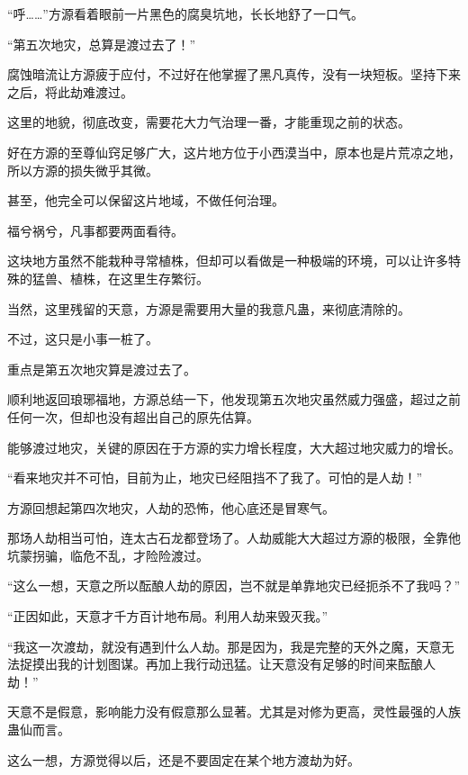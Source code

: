 
\begin{this_body}



“呼……”方源看着眼前一片黑色的腐臭坑地，长长地舒了一口气。

“第五次地灾，总算是渡过去了！”

腐蚀暗流让方源疲于应付，不过好在他掌握了黑凡真传，没有一块短板。坚持下来之后，将此劫难渡过。

这里的地貌，彻底改变，需要花大力气治理一番，才能重现之前的状态。

好在方源的至尊仙窍足够广大，这片地方位于小西漠当中，原本也是片荒凉之地，所以方源的损失微乎其微。

甚至，他完全可以保留这片地域，不做任何治理。

福兮祸兮，凡事都要两面看待。

这块地方虽然不能栽种寻常植株，但却可以看做是一种极端的环境，可以让许多特殊的猛兽、植株，在这里生存繁衍。

当然，这里残留的天意，方源是需要用大量的我意凡蛊，来彻底清除的。

不过，这只是小事一桩了。

重点是第五次地灾算是渡过去了。

顺利地返回琅琊福地，方源总结一下，他发现第五次地灾虽然威力强盛，超过之前任何一次，但却也没有超出自己的原先估算。

能够渡过地灾，关键的原因在于方源的实力增长程度，大大超过地灾威力的增长。

“看来地灾并不可怕，目前为止，地灾已经阻挡不了我了。可怕的是人劫！”

方源回想起第四次地灾，人劫的恐怖，他心底还是冒寒气。

那场人劫相当可怕，连太古石龙都登场了。人劫威能大大超过方源的极限，全靠他坑蒙拐骗，临危不乱，才险险渡过。

“这么一想，天意之所以酝酿人劫的原因，岂不就是单靠地灾已经扼杀不了我吗？”

“正因如此，天意才千方百计地布局。利用人劫来毁灭我。”

“我这一次渡劫，就没有遇到什么人劫。那是因为，我是完整的天外之魔，天意无法捉摸出我的计划图谋。再加上我行动迅猛。让天意没有足够的时间来酝酿人劫！”

天意不是假意，影响能力没有假意那么显著。尤其是对修为更高，灵性最强的人族蛊仙而言。

这么一想，方源觉得以后，还是不要固定在某个地方渡劫为好。


\end{this_body}
